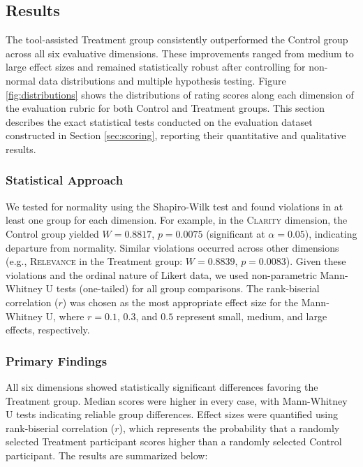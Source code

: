 
\subsection{Results}

The tool-assisted Treatment group consistently outperformed the Control group across all six evaluative dimensions. These improvements ranged from medium to large effect sizes and remained statistically robust after controlling for non-normal data distributions and multiple hypothesis testing. Figure \ref{fig:distributions} shows the distributions of rating scores along each dimension of the evaluation rubric for both Control and Treatment groups. This section describes the exact statistical tests conducted on the evaluation dataset constructed in Section \ref{sec:scoring}, reporting their quantitative and qualitative results.

\subsubsection*{Statistical Approach}

We tested for normality using the Shapiro-Wilk test and found violations in at least one group for each dimension. For example, in the \textsc{Clarity} dimension, the Control group yielded $W = 0.8817$, $p = 0.0075$ (significant at $\alpha = 0.05$), indicating departure from normality. Similar violations occurred across other dimensions (e.g., \textsc{Relevance} in the Treatment group: $W = 0.8839$, $p = 0.0083$). Given these violations and the ordinal nature of Likert data, we used non-parametric Mann-Whitney U tests (one-tailed) for all group comparisons.
The rank-biserial correlation ($r$) was chosen as the most appropriate effect size for the Mann-Whitney U, where $r = 0.1$, $0.3$, and $0.5$ represent small, medium, and large effects, respectively.

\subsubsection*{Primary Findings}

All six dimensions showed statistically significant differences favoring the Treatment group. Median scores were higher in every case, with Mann-Whitney U tests indicating reliable group differences. Effect sizes were quantified using rank-biserial correlation ($r$), which represents the probability that a randomly selected Treatment participant scores higher than a randomly selected Control participant.
The results are summarized below:

